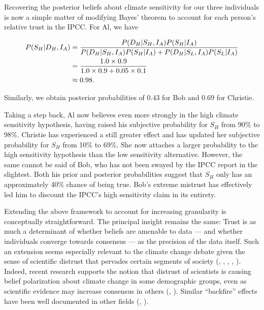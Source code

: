 \documentclass[smallextended]{svjour3}       %
\begin{document}
Recovering the posterior beliefs about climate sensitivity for our three
individuals is now a simple matter of modifying Bayes' theorem to
account for each person's relative trust in the IPCC. For Al, we have

\begin{align}
     P(S_H|D_H,I_A) &= \frac{P(D_H|S_H,I_A)P(S_H|I_A)}{P(D_H|S_H,I_A)P(S_H|I_A) + P(D_H|S_L,I_A)P(S_L|I_A)} \notag \\
                                    &= \frac{1.0\times0.9}{1.0\times0.9 + 0.05\times0.1} \notag \\
                                    &\approx 0.98. \notag
\end{align}

Similarly, we obtain posterior probabilities of 0.43 for Bob and 0.69
for Christie.

Taking a step back, Al now believes even more strongly in the high
climate sensitivity hypothesis, having raised his subjective probability
for \(S_H\) from 90\% to 98\%. Christie has experienced a still greater
effect and has updated her subjective probability for \(S_H\) from 10\%
to 69\%. She now attaches a larger probability to the high sensitivity
hypothesis than the low sensitivity alternative. However, the same
cannot be said of Bob, who has not been swayed by the IPCC report in the
slightest. Both his prior and posterior probabilities suggest that
\(S_H\) only has an approximately 40\% chance of being true. Bob's
extreme mistrust has effectively led him to discount the IPCC's high
sensitivity claim in its entirety.

Extending the above framework to account for increasing granularity is
conceptually straightforward. The principal insight remains the same:
Trust is as much a determinant of whether beliefs are amenable to data
--- and whether individuals converge towards consensus --- as the
precision of the data itself. Such an extension seems especially
relevant to the climate change debate given the sense of scientific
distrust that pervades certain segments of society
(\cite{malka2009association}, \cite{gauchat2012politicization},
\cite{leiserowitz2013climategate}, \cite{fiske2014gaining},
\cite{hmielowski2014attack}). Indeed, recent research supports the
notion that distrust of scientists is causing belief polarization about
climate change in some demographic groups, even as scientific evidence
may increase consensus in others (\cite{cook2016rational},
\cite{zhou2016boomerangs}). Similar ``backfire'' effects have been well
documented in other fields (\cite{nyhan2010backfire},
\cite{harris2015bayesian}).
\end{document}
